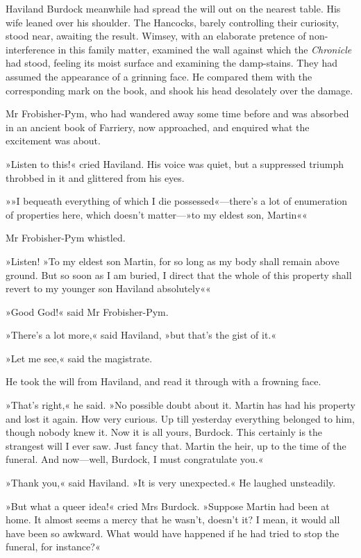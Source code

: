 Haviland Burdock meanwhile had spread the will out on the nearest table. His wife leaned over his shoulder. The Hancocks, barely controlling their curiosity, stood near, awaiting the result. Wimsey, with an elaborate pretence of non-interference in this family matter, examined the wall against which the \textit{Chronicle} had stood, feeling its moist surface and examining the damp-stains. They had assumed the appearance of a grinning face. He compared them with the corresponding mark on the book, and shook his head desolately over the damage.

Mr Frobisher-Pym, who had wandered away some time before and was absorbed in an ancient book of Farriery, now approached, and enquired what the excitement was about.

»Listen to this!« cried Haviland. His voice was quiet, but a suppressed triumph throbbed in it and glittered from his eyes.

»»I bequeath everything of which I die possessed«—there's a lot of enumeration of properties here, which doesn't matter—»to my eldest son, Martin«\longdash«

Mr Frobisher-Pym whistled.

»Listen! »To my eldest son Martin, for so long as my body shall remain above ground. But so soon as I am buried, I direct that the whole of this property shall revert to my younger son Haviland absolutely«\longdash«

»Good God!« said Mr Frobisher-Pym.

»There's a lot more,« said Haviland, »but that's the gist of it.«

»Let me see,« said the magistrate.

He took the will from Haviland, and read it through with a frowning face.

»That's right,« he said. »No possible doubt about it. Martin has had his property and lost it again. How very curious. Up till yesterday everything belonged to him, though nobody knew it. Now it is all yours, Burdock. This certainly is the strangest will I ever saw. Just fancy that. Martin the heir, up to the time of the funeral. And now—well, Burdock, I must congratulate you.«

»Thank you,« said Haviland. »It is very unexpected.« He laughed unsteadily.

»But what a queer idea!« cried Mrs Burdock. »Suppose Martin had been at home. It almost seems a mercy that he wasn't, doesn't it? I mean, it would all have been so awkward. What would have happened if he had tried to stop the funeral, for instance?«

